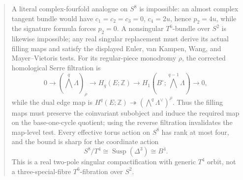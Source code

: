 \documentclass[11pt,letterpaper]{article}
\theoremstyle{definition}
\theoremstyle{remark}
\begin{document}
\begin{abstract}
 A literal complex-fourfold analogue on \(S^8\) is impossible: an almost
 complex tangent bundle would have
 \(c_1=c_2=c_3=0\), \(c_4=2u\), hence \(p_2=4u\), while the signature
 formula forces \(p_2=0\).  A nonsingular \(T^6\)-bundle over \(S^2\) is
 likewise impossible; any real singular replacement must derive its actual
 filling maps and satisfy the displayed Euler, van Kampen, Wang, and
 Mayer--Vietoris tests.  For its regular-piece monodromy \(\rho\), the
 corrected homological Serre filtration is
 \[
  0\longrightarrow(\textstyle\bigwedge^q\Lambda)_\rho
  \longrightarrow H_q(E;\mathbb Z)
  \longrightarrow
  H_1(B^\circ;\textstyle\bigwedge^{q-1}\Lambda)
  \longrightarrow0,
 \]
 while the dual edge map is
 \(H^q(E;\mathbb Z)\twoheadrightarrow
 (\bigwedge^q\Lambda^\vee)^\rho\).  Thus the filling maps must preserve the
 coinvariant subobject and induce the required map on the base-one-cycle
 quotient; using the reverse filtration invalidates the map-level test.
 Every effective torus action on \(S^8\) has rank at most four, and the bound
 is sharp for the coordinate action
 \[
  S^8/T^4\cong\operatorname{Susp}(\Delta^3)\cong B^4.
 \]
 This is a real two-pole singular compactification with generic \(T^4\)
 orbit, not a three-special-fibre \(T^6\)-fibration over \(S^2\).


\end{abstract}
\end{document}
